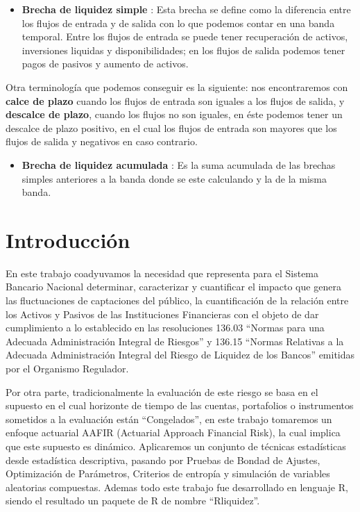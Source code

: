 \documentclass[10pt,]{article}
\providecommand{\tightlist}{%
  \setlength{\itemsep}{0pt}\setlength{\parskip}{0pt}}
\begin{document}
\begin{itemize}
\tightlist
\item
  \textbf{Brecha de liquidez simple} : Esta brecha se define como la
  diferencia entre los flujos de entrada y de salida con lo que podemos
  contar en una banda temporal. Entre los flujos de entrada se puede
  tener recuperación de activos, inversiones liquidas y
  disponibilidades; en los flujos de salida podemos tener pagos de
  pasivos y aumento de activos.
\end{itemize}

Otra terminología que podemos conseguir es la siguiente: nos
encontraremos con \textbf{calce de plazo} cuando los flujos de entrada
son iguales a los flujos de salida, y \textbf{descalce de plazo}, cuando
los flujos no son iguales, en éste podemos tener un descalce de plazo
positivo, en el cual los flujos de entrada son mayores que los flujos de
salida y negativos en caso contrario.

\begin{itemize}
\tightlist
\item
  \textbf{Brecha de liquidez acumulada} : Es la suma acumulada de las
  brechas simples anteriores a la banda donde se este calculando y la de
  la misma banda.
\end{itemize}

\hypertarget{introduccion}{%
\section{Introducción}\label{introduccion}}

En este trabajo coadyuvamos la necesidad que representa para el Sistema
Bancario Nacional determinar, caracterizar y cuantificar el impacto que
genera las fluctuaciones de captaciones del público, la cuantificación
de la relación entre los Activos y Pasivos de las Instituciones
Financieras con el objeto de dar cumplimiento a lo establecido en las
resoluciones 136.03 ``Normas para una Adecuada Administración Integral
de Riesgos'' y 136.15 ``Normas Relativas a la Adecuada Administración
Integral del Riesgo de Liquidez de los Bancos'' emitidas por el
Organismo Regulador.

Por otra parte, tradicionalmente la evaluación de este riesgo se basa en
el supuesto en el cual horizonte de tiempo de las cuentas, portafolios o
instrumentos sometidos a la evaluación están ``Congelados'', en este
trabajo tomaremos un enfoque actuarial AAFIR (Actuarial Approach
Financial Risk), la cual implica que este supuesto es dinámico.
Aplicaremos un conjunto de técnicas estadísticas desde estadística
descriptiva, pasando por Pruebas de Bondad de Ajustes, Optimización de
Parámetros, Criterios de entropía y simulación de variables aleatorias
compuestas. Ademas todo este trabajo fue desarrollado en lenguaje R,
siendo el resultado un paquete de R de nombre ``Rliquidez''.
\end{document}
